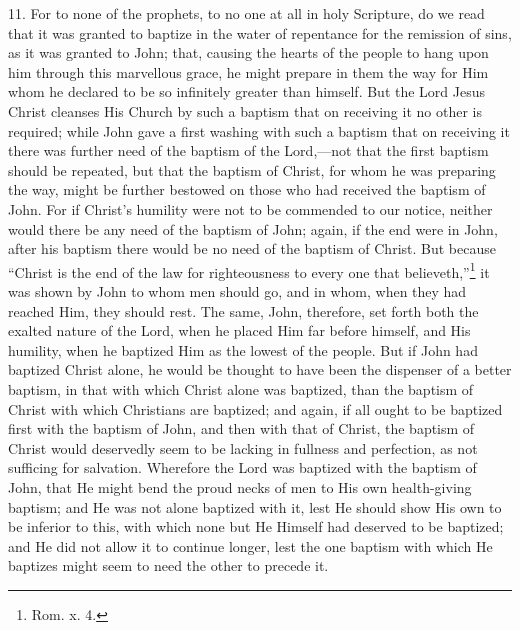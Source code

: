 11. For to none of the prophets, to no one at all in holy Scripture, do we read that it was granted to baptize in the water of repentance for the remission of sins, as it was granted to John; that, causing the hearts of the people to hang upon him through this marvellous grace, he might prepare in them the way for Him whom he declared to be so infinitely greater than himself. But the Lord Jesus Christ cleanses His Church by such a baptism that on receiving it no other is required; while John gave a first washing with such a baptism that on receiving it there was further need of the baptism of the Lord,—not that the first baptism should be repeated, but that the baptism of Christ, for whom he was preparing the way, might be further bestowed on those who had received the baptism of John. For if Christ’s humility were not to be commended to our notice, neither would there be any need of the baptism of John; again, if the end were in John, after his baptism there would be no need of the baptism of Christ. But because ``Christ is the end of the law for righteousness to every one that believeth,''\footnote{\par  Rom. x. 4.} it was shown by John to whom men should go, and in whom, when they had reached Him, they should rest. The same, John, therefore, set forth both the exalted nature of the Lord, when he placed Him far before himself, and His humility, when he baptized Him as the lowest of the people. But if John had baptized Christ alone, he would be thought to have been the dispenser of a better baptism, in that with which Christ alone was baptized, than the baptism of Christ with which Christians are baptized; and again, if all ought to be baptized first with the baptism of John, and then with that of Christ, the baptism of Christ would deservedly seem to be lacking in fullness and perfection, as not sufficing for salvation. Wherefore the Lord was baptized with the baptism of John, that He might bend the proud necks of men to His own health-giving baptism; and He was not alone baptized with it, lest He should show His own to be inferior to this, with which none but He Himself had deserved to be baptized; and He did not allow it to continue longer, lest the one baptism with which He baptizes might seem to need the other to precede it.


